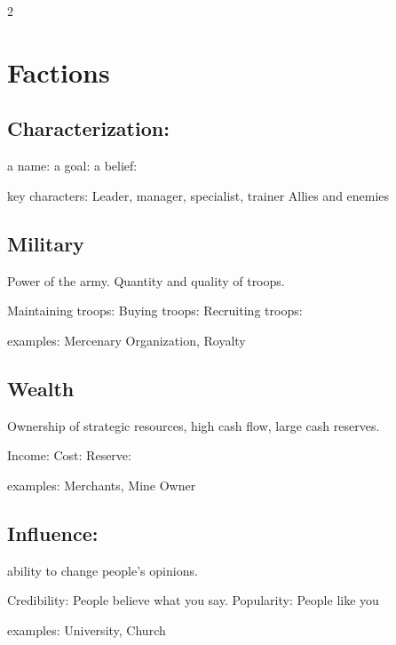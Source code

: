 \begin{multicols}{2}
\section{Factions}

\subsection{Characterization:}

a name:
a goal:
a belief:

key characters: Leader, manager, specialist, trainer 
Allies and enemies

\subsection{Military}
Power of the army. 
Quantity and quality of troops.

Maintaining troops:
Buying troops: 
Recruiting troops:

examples: Mercenary Organization, Royalty

\subsection{Wealth}
Ownership of strategic resources, high cash flow, large cash reserves.

Income:
Cost:
Reserve:

examples: Merchants, Mine Owner

\subsection{Influence:}
ability to change people's opinions.

Credibility: People believe what you say.
Popularity: People like you

examples: University, Church

\end{multicols}
